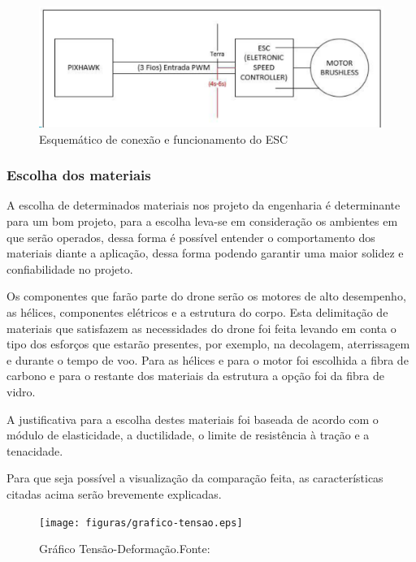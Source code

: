 \begin{figure}[H]
    \centering
      \includegraphics[keepaspectratio=true,scale=0.5]{figuras/elice.eps}
     \caption{Esquemático  de conexão e funcionamento  do ESC\cite{dji}}
    \label{fig:diagramaEstru}
\end{figure}

\subsubsection{Escolha dos materiais}

A escolha de determinados materiais nos projeto da engenharia é determinante para um bom projeto, para a escolha leva-se em  consideração os ambientes em que serão operados, dessa forma é possível entender o comportamento dos materiais diante a aplicação, dessa forma podendo garantir uma maior solidez e confiabilidade no projeto.

Os componentes que farão parte do drone serão os motores de alto desempenho, as hélices, componentes elétricos e a estrutura do corpo. Esta delimitação de materiais que satisfazem as necessidades do drone foi feita levando  em conta o tipo dos esforços que estarão  presentes,  por exemplo, na decolagem, aterrissagem  e durante o tempo  de voo. Para as hélices e para  o motor foi escolhida  a fibra de carbono  e para  o restante dos materiais da estrutura a opção foi da fibra de vidro.

A justificativa para a escolha destes materiais foi baseada de acordo com o módulo de elasticidade, a ductilidade, o limite de resistência à tração e a tenacidade. 

Para que seja possível a visualização da comparação feita, as características citadas acima serão brevemente explicadas.


\begin{figure}[H]
    \centering
      \texttt{[image: figuras/grafico-tensao.eps]}
    \caption{Gráfico Tensão-Deformação.Fonte: \cite{callister}}
    \label{fig:grafico-tensao}
\end{figure}

